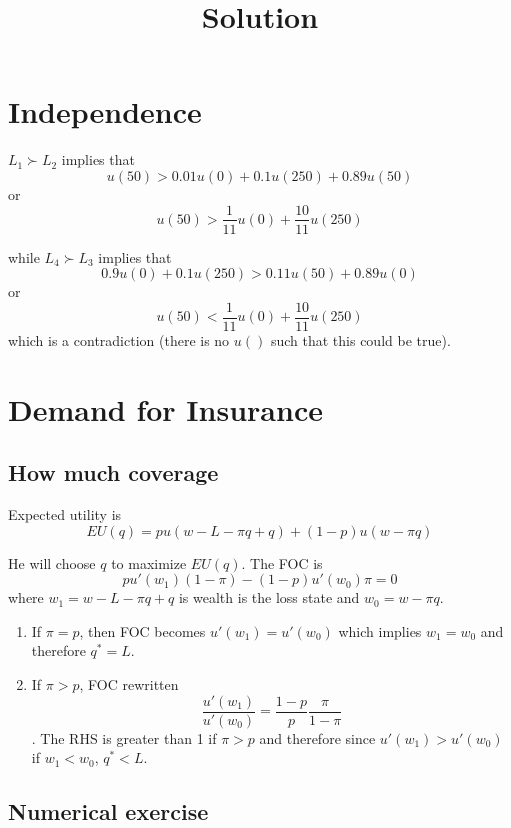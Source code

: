 \documentclass[11pt]{article}
\title{Solution}
\providecommand{\tightlist}{%
      \setlength{\itemsep}{0pt}\setlength{\parskip}{0pt}}
\begin{document}
    
    
    \maketitle
    
    

    
    \section{Independence}\label{independence}

    \(L_1 \succ L_2\) implies that
\[ u(50) > 0.01 u(0) + 0.1 u(250) + 0.89 u(50)\] or
\[ u(50)>\frac{1}{11}u(0) + \frac{10}{11}u(250)\]

while \(L_4 \succ L_3\) implies that
\[ 0.9 u(0) + 0.1 u(250) > 0.11u(50) + 0.89 u(0) \] or
\[ u(50) < \frac{1}{11} u(0) + \frac{10}{11}u(250) \] which is a
contradiction (there is no \(u()\) such that this could be true).

    \section{Demand for Insurance}\label{demand-for-insurance}

    \subsection{How much coverage}\label{how-much-coverage}

Expected utility is
\[ EU(q) = p u(w-L - \pi q + q) + (1-p) u(w-\pi q) \]

He will choose \(q\) to maximize \(EU(q)\). The FOC is
\[ p u'(w_1)(1-\pi) - (1-p) u'(w_0)\pi = 0\] where
\(w_1 = w-L-\pi q + q\) is wealth is the loss state and
\(w_0 = w- \pi q\).

\begin{enumerate}
\def\labelenumi{\arabic{enumi}.}
\tightlist
\item
  If \(\pi = p\), then FOC becomes \(u'(w_1) = u'(w_0)\) which implies
  \(w_1=w_0\) and therefore \(q^*=L\).
\item
  If \(\pi>p\), FOC rewritten
  \[ \frac{u'(w_1)}{u'(w_0)} = \frac{1-p}{p}\frac{\pi}{1-\pi} \]. The
  RHS is greater than 1 if \(\pi>p\) and therefore since
  \(u'(w_1)>u'(w_0)\) if \(w_1<w_0\), \(q^*<L\).
\end{enumerate}

    \subsection{Numerical exercise}\label{numerical-exercise}
\end{document}
